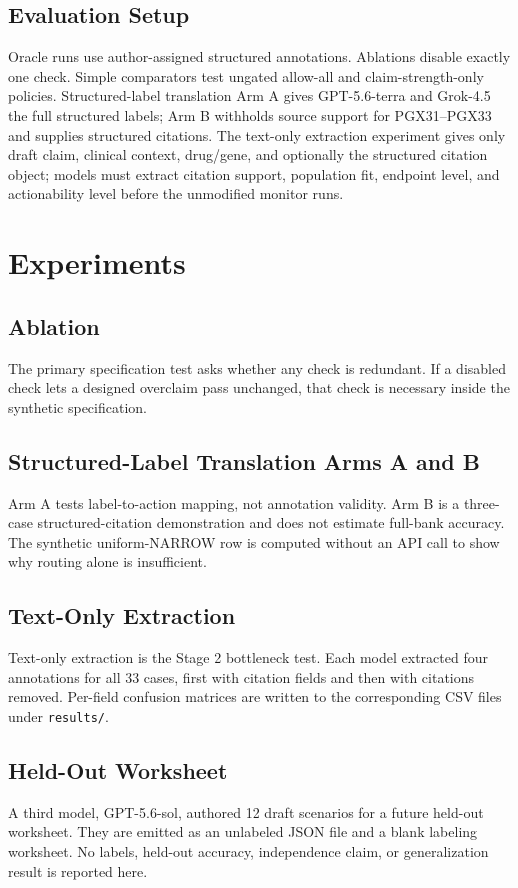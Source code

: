 \documentclass[pmlr,twocolumn,10pt]{jmlr}
\begin{document}
\subsection{Evaluation Setup}
Oracle runs use author-assigned structured annotations.
Ablations disable exactly one check.
Simple comparators test ungated allow-all and claim-strength-only policies.
Structured-label translation Arm A gives GPT-5.6-terra and Grok-4.5 the full structured labels; Arm B withholds source support for PGX31--PGX33 and supplies structured citations.
The text-only extraction experiment gives only draft claim, clinical context, drug/gene, and optionally the structured citation object; models must extract citation support, population fit, endpoint level, and actionability level before the unmodified monitor runs.

\section{Experiments}
\subsection{Ablation}
The primary specification test asks whether any check is redundant.
If a disabled check lets a designed overclaim pass unchanged, that check is necessary inside the synthetic specification.

\subsection{Structured-Label Translation Arms A and B}
Arm A tests label-to-action mapping, not annotation validity.
Arm B is a three-case structured-citation demonstration and does not estimate full-bank accuracy.
The synthetic uniform-NARROW row is computed without an API call to show why routing alone is insufficient.

\subsection{Text-Only Extraction}
Text-only extraction is the Stage 2 bottleneck test.
Each model extracted four annotations for all 33 cases, first with citation fields and then with citations removed.
Per-field confusion matrices are written to the corresponding CSV files under \texttt{results/}.

\subsection{Held-Out Worksheet}
A third model, GPT-5.6-sol, authored 12 draft scenarios for a future held-out worksheet.
They are emitted as an unlabeled JSON file and a blank labeling worksheet.
No labels, held-out accuracy, independence claim, or generalization result is reported here.
\end{document}
